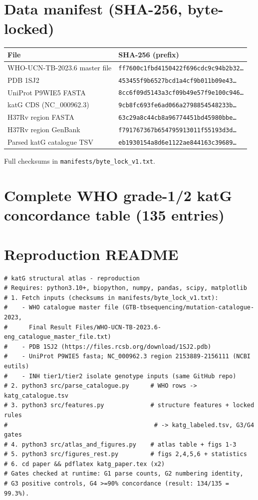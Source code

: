 \documentclass[11pt]{article}
\begin{document}
\section{Data manifest (SHA-256, byte-locked)}
\begin{center}\scriptsize
\begin{tabular}{ll}
\hline
File & SHA-256 (prefix)\\
\hline
WHO-UCN-TB-2023.6 master file & \texttt{ff7600c1fbd4150422f696cdc9c94b2b32\ldots}\\
PDB 1SJ2 & \texttt{453455f9b6527bcd1a4cf9b011b09e43\ldots}\\
UniProt P9WIE5 FASTA & \texttt{8cc6f09d5143a3cf09b49e57f9e100c946\ldots}\\
katG CDS (NC\_000962.3) & \texttt{9cb8fc693fe6ad066a2798854548233b\ldots}\\
H37Rv region FASTA & \texttt{63c29a8c44cb8a96774451bd45980bbe\ldots}\\
H37Rv region GenBank & \texttt{f791767367b654795913011f55193d3d\ldots}\\
Parsed katG catalogue TSV & \texttt{eb1930154a8d6e1122ae844163c39689\ldots}\\
\hline
\end{tabular}
\end{center}
Full checksums in \texttt{manifests/byte\_lock\_v1.txt}.


\section{Complete WHO grade-1/2 katG concordance table (135 entries)}


\section{Reproduction README}
\begin{verbatim}
# katG structural atlas - reproduction
# Requires: python3.10+, biopython, numpy, pandas, scipy, matplotlib
# 1. Fetch inputs (checksums in manifests/byte_lock_v1.txt):
#    - WHO catalogue master file (GTB-tbsequencing/mutation-catalogue-2023,
#      Final Result Files/WHO-UCN-TB-2023.6-eng_catalogue_master_file.txt)
#    - PDB 1SJ2 (https://files.rcsb.org/download/1SJ2.pdb)
#    - UniProt P9WIE5 fasta; NC_000962.3 region 2153889-2156111 (NCBI eutils)
#    - INH tier1/tier2 isolate genotype inputs (same GitHub repo)
# 2. python3 src/parse_catalogue.py      # WHO rows -> katg_catalogue.tsv
# 3. python3 src/features.py             # structure features + locked rules
#                                         # -> katg_labeled.tsv, G3/G4 gates
# 4. python3 src/atlas_and_figures.py    # atlas table + figs 1-3
# 5. python3 src/figures_rest.py         # figs 2,4,5,6 + statistics
# 6. cd paper && pdflatex katg_paper.tex (x2)
# Gates checked at runtime: G1 parse counts, G2 numbering identity,
# G3 positive controls, G4 >=90% concordance (result: 134/135 = 99.3%).
\end{verbatim}
\end{document}
